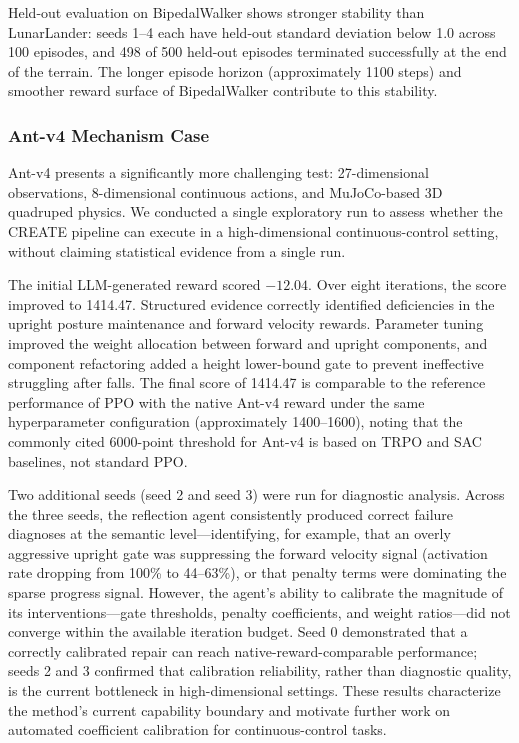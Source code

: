 \documentclass[letterpaper,twocolumn,10pt]{article}
\begin{document}
Held-out evaluation on BipedalWalker shows stronger stability than LunarLander: seeds 1--4 each have held-out standard deviation below 1.0 across 100 episodes, and 498 of 500 held-out episodes terminated successfully at the end of the terrain. The longer episode horizon (approximately 1100 steps) and smoother reward surface of BipedalWalker contribute to this stability.

\subsubsection{Ant-v4 Mechanism Case}

Ant-v4 presents a significantly more challenging test: 27-dimensional observations, 8-dimensional continuous actions, and MuJoCo-based 3D quadruped physics. We conducted a single exploratory run to assess whether the CREATE pipeline can execute in a high-dimensional continuous-control setting, without claiming statistical evidence from a single run.

The initial LLM-generated reward scored $-12.04$. Over eight iterations, the score improved to 1414.47. Structured evidence correctly identified deficiencies in the upright posture maintenance and forward velocity rewards. Parameter tuning improved the weight allocation between forward and upright components, and component refactoring added a height lower-bound gate to prevent ineffective struggling after falls. The final score of 1414.47 is comparable to the reference performance of PPO with the native Ant-v4 reward under the same hyperparameter configuration (approximately 1400--1600), noting that the commonly cited 6000-point threshold for Ant-v4 is based on TRPO and SAC baselines, not standard PPO.

Two additional seeds (seed 2 and seed 3) were run for diagnostic analysis. Across the three seeds, the reflection agent consistently produced correct failure diagnoses at the semantic level---identifying, for example, that an overly aggressive upright gate was suppressing the forward velocity signal (activation rate dropping from 100\% to 44--63\%), or that penalty terms were dominating the sparse progress signal. However, the agent's ability to calibrate the magnitude of its interventions---gate thresholds, penalty coefficients, and weight ratios---did not converge within the available iteration budget. Seed 0 demonstrated that a correctly calibrated repair can reach native-reward-comparable performance; seeds 2 and 3 confirmed that calibration reliability, rather than diagnostic quality, is the current bottleneck in high-dimensional settings. These results characterize the method's current capability boundary and motivate further work on automated coefficient calibration for continuous-control tasks.
\end{document}
